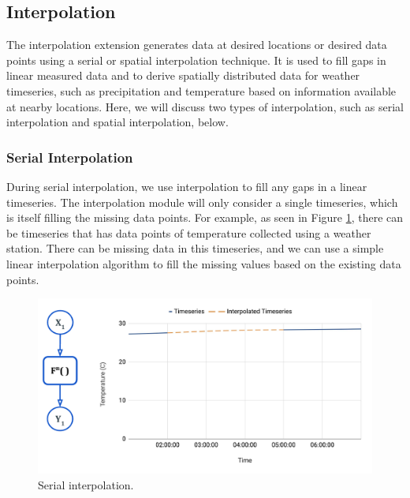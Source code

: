 \subsection{Interpolation}
The interpolation extension generates data at desired locations or desired data points using a serial or spatial interpolation technique. It is used to fill gaps in linear measured data and to derive spatially distributed data for weather timeseries, such as precipitation and temperature based on information available at nearby locations. Here, we will discuss two types of interpolation, such as serial interpolation and spatial interpolation, below.

\subsubsection{Serial Interpolation}
During serial interpolation, we use interpolation to fill any gaps in a linear timeseries. The interpolation module will only consider a single timeseries, which is itself filling the missing data points. For example, as seen in Figure \ref{fi:serial_interpolation}, there can be timeseries that has data points of temperature collected using a weather station. There can be missing data in this timeseries, and we can use a simple linear interpolation algorithm to fill the missing values based on the existing data points.

\begin{figure}[htp]
    \centering
    \includegraphics[width=1.0\textwidth]{method/data_preprocess/serial_interpolation.pdf}
    \caption{Serial interpolation.}
    \label{fi:serial_interpolation}
\end{figure}

